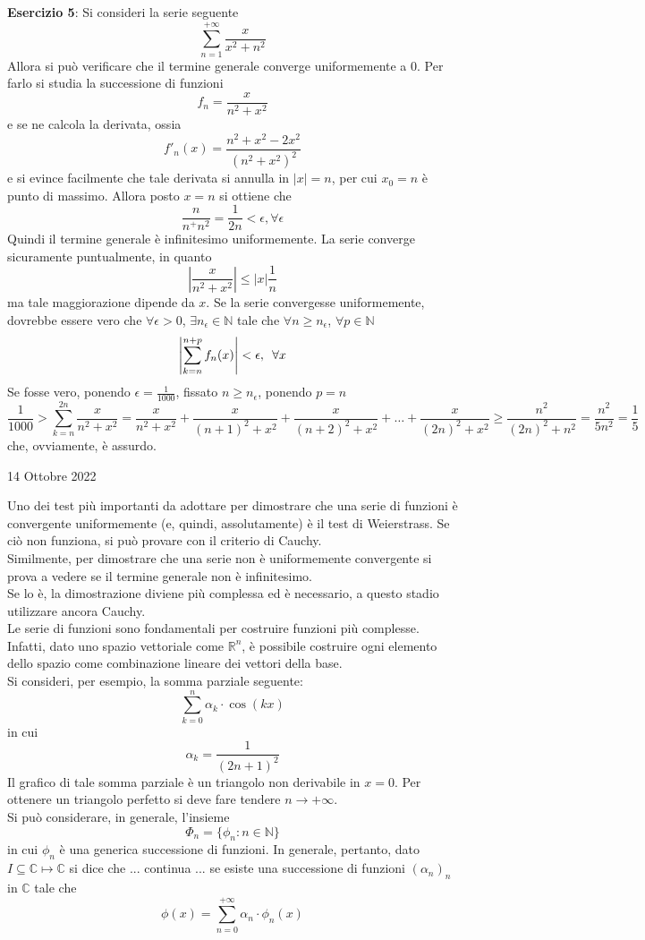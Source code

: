 \documentclass[a4paper]{extarticle}
\begin{document}
\vspace{1em}
\noindent
\textbf{Esercizio 5}: Si consideri la serie seguente
\[\sum_{n=1}^{+\infty} \frac{x}{x^2+n^2}\]
Allora si può verificare che il termine generale converge uniformemente a $0$. Per farlo si studia la successione di funzioni
\[f_n = \frac{x}{n^2+x^2}\]
e se ne calcola la derivata, ossia
\[f'_n(x) = \frac{n^2 + x^2 - 2x^2}{(n^2+x^2)^2}\]
e si evince facilmente che tale derivata si annulla in $\vert x \vert = n$, per cui $x_0=n$ è punto di massimo. Allora posto $x=n$ si ottiene che
\[\frac{n}{n^+n^2} = \frac{1}{2n} < \epsilon, \forall \epsilon\]
Quindi il termine generale è infinitesimo uniformemente. La serie converge sicuramente puntualmente, in quanto
\[\left \vert \frac{x}{n^2+x^2} \right \vert \leq \left \vert x \right \vert \frac{1}{n}\]
ma tale maggiorazione dipende da $x$. Se la serie convergesse uniformemente, dovrebbe essere vero che $\forall \epsilon > 0$, $\exists n_\epsilon \in \mathbb{N}$ tale che $\forall n \geq n_\epsilon$, $\forall p \in \mathbb{N}$
\[\left \vert \sum_{k=n}^{n+p} f_n(x) \right \vert < \epsilon, \hspace{0.5em} \forall x\]
Se fosse vero, ponendo $\epsilon=\frac{1}{1000}$, fissato $n \geq n_\epsilon$, ponendo $p=n$
\[\frac{1}{1000} > \sum_{k=n}^{2n} \frac{x}{n^2+x^2} = \frac{x}{n^2+x^2}+\frac{x}{(n+1)^2+x^2}+\frac{x}{(n+2)^2+x^2}+\dots+\frac{x}{(2n)^2+x^2} \geq \frac{n^2}{(2n)^2 + n^2} = \frac{n^2}{5n^2} = \frac{1}{5}\]
che, ovviamente, è assurdo.

\newpage
\noindent
\begin{center}
    14 Ottobre 2022
\end{center}
Uno dei test più importanti da adottare per dimostrare che una serie di funzioni è convergente uniformemente (e, quindi, assolutamente) è il test di Weierstrass. Se ciò non funziona, si può provare con il criterio di Cauchy.\\
Similmente, per dimostrare che una serie non è uniformemente convergente si prova a vedere se il termine generale non è infinitesimo.\\
Se lo è, la dimostrazione diviene più complessa ed è necessario, a questo stadio utilizzare ancora Cauchy.\\
Le serie di funzioni sono fondamentali per costruire funzioni più complesse. Infatti, dato uno spazio vettoriale come $\mathbb{R}^n$, è possibile costruire ogni elemento dello spazio come combinazione lineare dei vettori della base.\\
Si consideri, per esempio, la somma parziale seguente:
\[\sum_{k=0}^{n} \alpha_k \cdot \cos(kx)\]
in cui
\[\alpha_k = \frac{1}{(2n+1)^2}\]
Il grafico di tale somma parziale è un triangolo non derivabile in $x=0$. Per ottenere un triangolo perfetto si deve fare tendere $n \to +\infty$.\\
Si può considerare, in generale, l'insieme
\[\Phi_n = \{\phi_n : n \in \mathbb{N}\}\]
in cui $\phi_n$ è una generica successione di funzioni. In generale, pertanto, dato $I \subseteq \mathbb{C} \longmapsto \mathbb{C}$
si dice che ... continua ... se esiste una successione di funzioni $(\alpha_n)_n$ in $\mathbb{C}$ tale che
\[\phi(x) = \sum_{n=0}^{+\infty} \alpha_n \cdot \phi_n(x)\]
\end{document}
